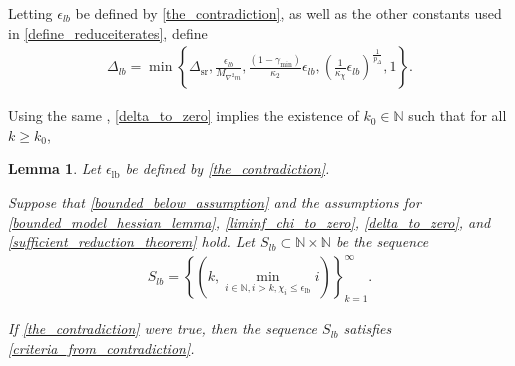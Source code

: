 \documentclass{article}
\newtheorem{lemma}[theorem]{Lemma}
\theoremstyle{case}
\numberwithin{theorem}{subsection}
\newcommand{\dsr}{{\Delta_{\textrm{sr}}}}
\newcommand{\gammasm}{\gamma_{\textrm{min}}}
\newcommand{\maxmodelhessian}{{M_{\nabla^2 m}}}
\newcommand{\naturals}{\mathbb N}
\newcommand{\theirc}{{\kappa_2}}
\begin{document}
Letting $\epsilon_{lb}$ be defined by \cref{the_contradiction}, as well as the other constants used in \cref{define_reduceiterates},
define
\begin{align}
\Delta_{lb} = \min\left\{
\dsr,
\frac{\epsilon_{lb}}{\maxmodelhessian}, 
\frac{(1-\gammasm)}{\theirc}\epsilon_{lb}, 
\left(\frac 1 {\kappa_{\chi}}  \epsilon_{lb} \right)^{\frac 1 {p_{\Delta}}}, 
1
\right\}. \label{define_delta_lb}
\end{align}


Using the same , \cref{delta_to_zero} implies the existence of $k_0 \in \naturals$ such that for all $k \ge k_0$,

\begin{lemma}
\label{contradiction_portion}
Let $ \epsilon_{\textrm{lb}} $ be defined by \cref{the_contradiction}.

Suppose that 
\cref{bounded_below_assumption}
and the assumptions for
\cref{bounded_model_hessian_lemma}, \cref{liminf_chi_to_zero}, \cref{delta_to_zero}, and \cref{sufficient_reduction_theorem} hold.
Let 
$S_{lb} \subset \naturals \times \naturals$ be the sequence
\begin{align}
\label{define_slb}
S_{lb} = \left\{\left(k,
\min_{i \in \naturals, i > k, \chi_{i} \le \epsilon_{\textrm{lb}}} i
\right)\right\}_{k=1}^{\infty}.
\end{align}

If \cref{the_contradiction} were true, then the sequence $S_{lb}$ satisfies \cref{criteria_from_contradiction}.
\end{lemma}
\end{document}
